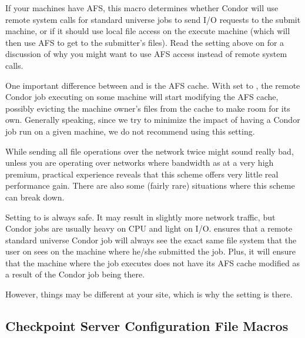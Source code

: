 \begin{description}
\label{param:UseAfs}
\item[\Macro{USE\_AFS}]
  If your machines have AFS,
  this macro determines whether Condor will use remote system calls for
  standard universe jobs to send I/O requests to the submit machine,
  or if it should use local file access on the execute machine (which
  will then use AFS to get to the submitter's files).  Read the
  setting above on  for a discussion of why you might
  want to use AFS access instead of remote system calls.
  
  One important difference between  and
   is the AFS cache.  With  set to
  , the remote Condor job executing on some machine will start
  modifying the AFS cache, possibly evicting the machine owner's
  files from the cache to make room for its own.  Generally speaking,
  since we try to minimize the impact of having a Condor job run on a
  given machine, we do not recommend using this setting.

  While sending all file operations over the network twice might sound
  really bad, unless you are operating over networks where bandwidth
  as at a very high premium, practical experience reveals that this
  scheme offers very little real performance gain.  There are also
  some (fairly rare) situations where this scheme can break down.
  
  Setting  to  is always safe.  It may result
  in slightly more network traffic, but Condor jobs are usually heavy
  on CPU and light on I/O.   ensures that a remote
  standard universe Condor job will always see the exact same
  file system that the user on sees on the machine where he/she
  submitted the job.  Plus, it will ensure that the machine where the
  job executes does not have its AFS cache modified as a result of
  the Condor job being there.  
  
  However, things may be different at your site, which is why the
  setting is there.

\end{description}

\subsection{\label{sec:Checkpoint-Server-Config-File-Entries}Checkpoint Server Configuration File Macros} 

